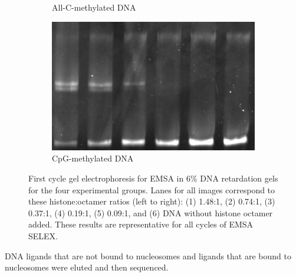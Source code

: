 \documentclass[parskip=full, numbers=noenddot]{scrreprt}
\begin{document}
\begin{figure}[htpb]
\begin{subfigure}[htpb]{0.4\textwidth}
    \caption{All-C-methylated DNA}
    \label{fig:reconstnuc_c}
  \end{subfigure}
  \begin{subfigure}[htpb]{0.4\textwidth}
    \centering
    \includegraphics[width=\textwidth]{reconstnuc_d}
    \caption{CpG-methylated DNA}
    \label{fig:reconstnuc_d}
  \end{subfigure}
  \caption{First cycle gel electrophoresis for EMSA in 6\% DNA retardation gels for the four experimental groups.  Lanes for all images correspond to these histone:octamer ratios (left to right): (1) 1.48:1, (2) 0.74:1, (3) 0.37:1, (4) 0.19:1, (5) 0.09:1, and (6) DNA without histone octamer added.  These results are representative for all cycles of EMSA SELEX.}
  \label{fig:reconstnuc}
\end{figure}

DNA ligands that are not bound to nucleosomes and ligands that are bound to nucleosomes were eluted and then sequenced.
\end{document}
